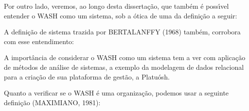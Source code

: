 \documentclass[
12pt,		%
openright,	%
twoside,  %
a4paper,			%
chapter=TITLE,		%
english,			%
french,				%
spanish,			%
brazil				%
]{USPSC-classe/USPSC}
\begin{document}
Por outro lado, veremos, ao longo desta disserta\c{c}\~ao, que tamb\'em \'e poss\'{\i}vel entender o WASH como um sistema, sob a \'otica de uma da defini\c{c}\~ao a seguir:









\noindent\begin{center}\mbox{\centering{}}\end{center}


A defini\c{c}\~ao de sistema trazida por BERTALANFFY (1968) tamb\'em, corrobora com esse entendimento:









\noindent\begin{center}\mbox{\centering{}}\end{center}


A import\^ancia de considerar o WASH como um sistema tem a ver com aplica\c{c}\~ao de m\'etodos de an\'alise de sistemas, a exemplo da modelagem de dados relacional para a cria\c{c}\~ao de sua plataforma de gest\~ao, a \textquotedbl Platu\'osh\textquotedbl .








Quanto a verificar se o WASH \'e uma organiza\c{c}\~ao, podemos usar a seguinte defini\c{c}\~ao  (MAXIMIANO, 1981):









\noindent\begin{center}\mbox{\centering{}}\end{center}
\end{document}
